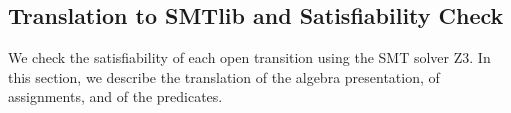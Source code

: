 \documentclass[smallcondensed]{svjour3}
\newcommand{\noteInEM}[2][inline,color=green!40]{\todo[#1]{{\bf Eric: } {#2}}}
\newcommand{\ERIC}[1]{\textcolor{blue}{#1}}
\begin{document}
  


  


  




\subsection{Translation to SMTlib and Satisfiability Check}
\label{section:TranslationToSMTlib}

We check the satisfiability of each open transition
using the SMT solver Z3.
In this
section, we describe the translation of the algebra presentation, of
assignments, and of the predicates.
\end{document}
